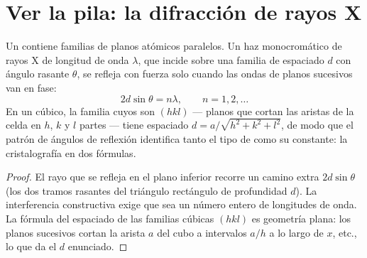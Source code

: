\section{Ver la pila: la difracción de rayos X}

\begin{proposition}\label{prop:b3:crystalline-solids:bragg}
Un  contiene familias de planos atómicos paralelos. Un
haz monocromático de rayos X de longitud de onda $\lambda$, que incide sobre una familia
de espaciado $d$ con ángulo rasante $\theta$, se refleja con fuerza solo
cuando las ondas de planos sucesivos van en fase:
\[
2d\sin\theta = n\lambda , \qquad n = 1, 2, \dots
\]
En un  cúbico, la familia cuyos \emph{} son
$(hkl)$ --- planos que cortan las aristas de la celda en $h$, $k$ y $l$ partes
--- tiene espaciado $d = a/\sqrt{h^2 + k^2 + l^2}$, de modo que el patrón de
ángulos de reflexión identifica tanto el tipo de  como su
constante: la cristalografía en dos fórmulas.
\end{proposition}

\begin{proof}
El rayo que se refleja en el plano inferior recorre un camino extra $2d
\sin\theta$ (los dos tramos rasantes del triángulo rectángulo de profundidad $d$).
La interferencia constructiva exige que sea un número entero de
longitudes de onda. La fórmula del espaciado de las familias cúbicas $(hkl)$ es
geometría plana: los planos sucesivos cortan la arista $a$ del cubo a
intervalos $a/h$ a lo largo de $x$, etc., lo que da el $d$ enunciado.
\end{proof}

